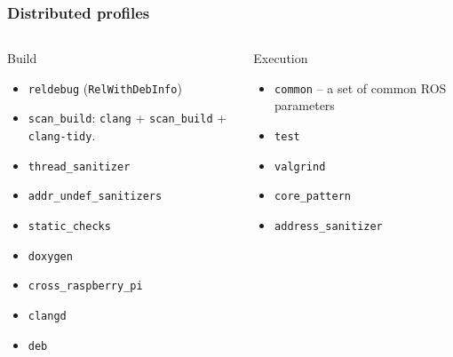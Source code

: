 \documentclass[hyperref={colorlinks=false, breaklinks=true},11pt]{beamer}
\begin{document}
\begin{frame}
    \frametitle{Distributed profiles}

    \begin{columns}[T]
    \begin{column}{.49\textwidth}
        \begin{block}{Build}
            \begin{itemize}
                \item \texttt{reldebug} (\texttt{RelWithDebInfo})
                \item \texttt{scan\_build}: \texttt{clang} + \texttt{scan\_build} + \texttt{clang-tidy}.
                \item \texttt{thread\_sanitizer}
                \item \texttt{addr\_undef\_sanitizers}
                \item \texttt{static\_checks}
                \item \texttt{doxygen}
                \item \texttt{cross\_raspberry\_pi}
                \item \texttt{clangd}
                \item \texttt{deb}
            \end{itemize}
        \end{block}
    \end{column}
    \begin{column}{.49\textwidth}
        \begin{block}{Execution}
            \begin{itemize}
                \item \texttt{common} -- a set of common ROS parameters
                \item \texttt{test}
                \item \texttt{valgrind}
                \item \texttt{core\_pattern}
                \item \texttt{address\_sanitizer}
            \end{itemize}
        \end{block}
    \end{column}
    \end{columns}
\end{frame}
\end{document}
